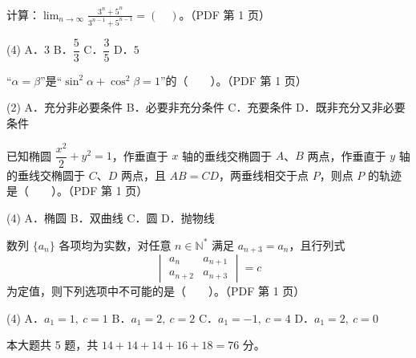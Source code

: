 \begin{question}
计算：$\displaystyle\lim_{n\to\infty}\frac{3^n+5^n}{3^{n-1}+5^{n-1}}=\left(\quad\right)$。（PDF 第 1 页）

\begin{gkopts}(4)
\task A．$3$
\task B．$\dfrac53$
\task C．$\dfrac35$
\task D．$5$
\end{gkopts}

\end{question}
\begin{question}
“$\alpha=\beta$”是“$\sin^2\alpha+\cos^2\beta=1$”的\mbox{（　　）}。（PDF 第 1 页）

\begin{gkopts}(2)
\task A．充分非必要条件
\task B．必要非充分条件
\task C．充要条件
\task D．既非充分又非必要条件
\end{gkopts}

\end{question}
\begin{question}
已知椭圆 $\dfrac{x^2}{2}+y^2=1$，作垂直于 $x$ 轴的垂线交椭圆于 $A$、$B$ 两点，作垂直于 $y$ 轴的垂线交椭圆于 $C$、$D$ 两点，且 $AB=CD$，两垂线相交于点 $P$，则点 $P$ 的轨迹是\mbox{（　　）}。（PDF 第 1 页）

\begin{gkopts}(4)
\task A．椭圆
\task B．双曲线
\task C．圆
\task D．抛物线
\end{gkopts}

\end{question}
\begin{question}
数列 $\{a_n\}$ 各项均为实数，对任意 $n\in\mathbb N^*$ 满足 $a_{n+3}=a_n$，且行列式
\nopagebreak[4]
\[
\begin{vmatrix}a_n&a_{n+1}\\a_{n+2}&a_{n+3}\end{vmatrix}=c
\]
为定值，则下列选项中不可能的是\mbox{（　　）}。（PDF 第 1 页）

\begin{gkopts}(4)
\task A．$a_1=1,\ c=1$
\task B．$a_1=2,\ c=2$
\task C．$a_1=-1,\ c=4$
\task D．$a_1=2,\ c=0$
\end{gkopts}

\end{question}

\begin{gktip}
本大题共 5 题，共 $14+14+14+16+18=76$ 分。
\end{gktip}

